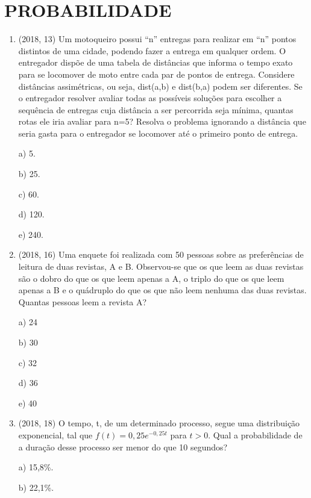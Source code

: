 \documentclass{article}
\begin{document}
\section{PROBABILIDADE}
\begin{enumerate}


\item (2018, 13) Um motoqueiro possui “n” entregas para realizar em “n” pontos distintos de uma
cidade, podendo fazer a entrega em qualquer ordem. O entregador dispõe de uma tabela de
distâncias que informa o tempo exato para se locomover de moto entre cada par de pontos de
entrega. Considere distâncias assimétricas, ou seja, dist(a,b) e dist(b,a) podem ser diferentes. Se o
entregador resolver avaliar todas as possíveis soluções para escolher a sequência de entregas cuja
distância a ser percorrida seja mínima, quantas rotas ele iria avaliar para n=5? Resolva o problema
ignorando a distância que seria gasta para o entregador se locomover até o primeiro ponto de
entrega.


a) 5.

b) 25.

c) 60.

d) 120.

e) 240.\newline



\item (2018, 16) Uma enquete foi realizada com 50 pessoas sobre as preferências de leitura de duas
revistas, A e B. Observou-se que os que leem as duas revistas são o dobro do que os que leem
apenas a A, o triplo do que os que leem apenas a B e o quádruplo do que os que não leem nenhuma
das duas revistas. Quantas pessoas leem a revista A?

a) 24

b) 30

c) 32

d) 36

e) 40\newline







\item (2018, 18) O tempo, t, de um determinado processo, segue uma distribuição exponencial, tal
que $f(t) = 0,25e^{-0,25t}$ para $t > 0$. Qual a probabilidade de a duração desse processo ser menor do
que 10 segundos?

a) 15,8\%.

b) 22,1\%.


\end{enumerate}
\end{document}
